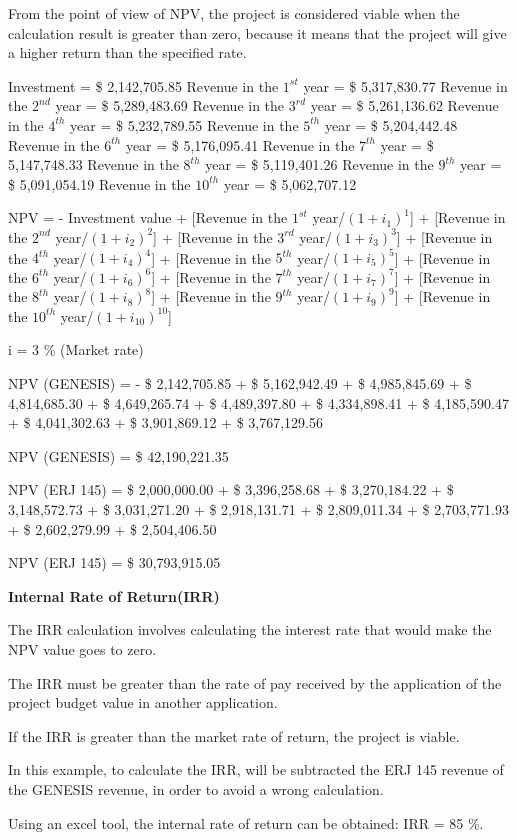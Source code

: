 From the point of view of NPV, the project is considered viable when the calculation result is greater than zero, because it means that the project will give a higher return than the specified rate.

Investment = \$ 2,142,705.85
Revenue in the $1^{st}$ year = \$ 5,317,830.77
Revenue in the $2^{nd}$ year = \$ 5,289,483.69
Revenue in the $3^{rd}$ year = \$ 5,261,136.62
Revenue in the $4^{th}$ year = \$ 5,232,789.55
Revenue in the $5^{th}$ year = \$ 5,204,442.48
Revenue in the $6^{th}$ year = \$ 5,176,095.41
Revenue in the $7^{th}$ year = \$ 5,147,748.33
Revenue in the $8^{th}$ year = \$ 5,119,401.26
Revenue in the $9^{th}$ year = \$ 5,091,054.19
Revenue in the $10^{th}$ year = \$ 5,062,707.12

NPV = - Investment value + [Revenue in the $1^{st}$ year/$(1 + i_{1})^{1}$] + [Revenue in the $2^{nd}$ year/$(1 + i_{2})^{2}$] + [Revenue in the $3^{rd}$ year/$(1 + i_{3})^{3}$] + [Revenue in the $4^{th}$ year/$(1 + i_{4})^{4}$] + [Revenue in the $5^{th}$ year/$(1 + i_{5})^{5}$] + [Revenue in the $6^{th}$ year/$(1 + i_{6})^{6}$] + [Revenue in the $7^{th}$ year/$(1 + i_{7})^{7}$] + [Revenue in the $8^{th}$ year/$(1 + i_{8})^{8}$] + [Revenue in the $9^{th}$ year/$(1 + i_{9})^{9}$] + [Revenue in the $10^{th}$ year/$(1 + i_{10})^{10}$]

i = 3 \% (Market rate)

NPV (GENESIS) = - \$ 2,142,705.85 + \$ 5,162,942.49 + \$ 4,985,845.69 + \$ 4,814,685.30 + \$ 4,649,265.74 + \$ 4,489,397.80 + \$ 4,334,898.41 + \$ 4,185,590.47 + \$ 4,041,302.63 + \$ 3,901,869.12 + \$ 3,767,129.56

NPV (GENESIS) = \$ 42,190,221.35

NPV (ERJ 145) = \$ 2,000,000.00 + \$ 3,396,258.68 + \$ 3,270,184.22 + \$ 3,148,572.73 + \$ 3,031,271.20 + \$ 2,918,131.71 + \$ 2,809,011.34 + \$ 2,703,771.93 + \$ 2,602,279.99 + \$ 2,504,406.50

NPV (ERJ 145) = \$ 30,793,915.05

\textbf{Internal Rate of Return(IRR)}

The IRR calculation involves calculating the interest rate that would make the NPV value goes to zero.

The IRR must be greater than the rate of pay received by the application of the project budget value in another application.

If the IRR is greater than the market rate of return, the project is viable.

In this example, to calculate the IRR, will be subtracted the ERJ 145 revenue of the GENESIS revenue, in order to avoid a wrong calculation.

Using an excel tool, the internal rate of return can be obtained:
IRR = 85 \%.
